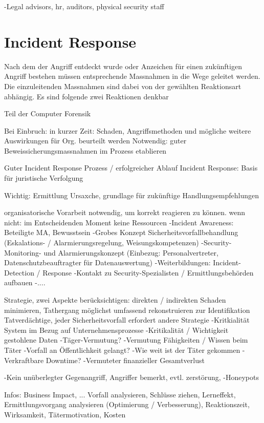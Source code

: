 -Legal advisors, hr, auditors, physical security staff

\section{Incident Response}
Nach dem der Angriff entdeckt wurde oder Anzeichen für einen zukünftigen Angriff bestehen müssen entsprechende Massnahmen in die Wege geleitet werden. Die einzuleitenden Massnahmen sind dabei von der gewählten Reaktionsart abhängig. Es sind folgende zwei Reaktionen denkbar

Teil der Computer Forensik

Bei Einbruch: in kurzer Zeit: Schaden, Angriffsmethoden und mögliche weitere Auswirkungen für Org. beurteilt werden
Notwendig: guter Beweissicherungsmassnahmen im Prozess etablieren

Guter Incident Response Prozess / erfolgreicher Ablauf Incident Response: Basis für juristische Verfolgung

Wichtig: Ermittlung Ursaxche, grundlage für zukünftige Handlungsempfehlungen

organisatorische Vorarbeit notwendig, um korrekt reagieren zu können. wenn nicht: im Entscheidenden Moment keine Ressourcen
-Incident Awareness: Beteiligte MA, Bewusstsein
-Grobes Konzept Sicherheitsvorfallbehandlung (Eskalations- / Alarmierungsregelung, Weisungskompetenzen)
-Security-Monitoring- und Alarmierungskonzept (Einbezug: Personalvertreter, Datenschutzbeauftragter für Datenauswertung)
-Weiterbildungen: Incident-Detection / Response
-Kontakt zu Security-Spezialisten / Ermittlungsbehörden aufbauen
-....

Strategie, zwei Aspekte berücksichtigen: direkten / indirekten Schaden minimieren, Tathergang möglichst umfassend rekonstruieren zur Identifikation Tatverdächtige, jeder Sicherheitsvorfall erfordert andere Strategie
-Kritkialität System im Bezug auf Unternehmensprozesse
-Kritikalität / Wichtigkeit gestohlene Daten
-Täger-Vermutung?
-Vermutung Fähigkeiten / Wissen beim Täter
-Vorfall an Öffentlichkeit gelangt?
-Wie weit ist der Täter gekommen
-Verkraftbare Downtime?
-Vermuteter finanzieller Gesamtverlust

-Kein unüberlegter Gegenangriff, Angriffer bemerkt, evtl. zerstörung,
-Honeypots

Infos: Business Impact, ...
Vorfall analysieren, Schlüsse ziehen, Lerneffekt, Ermittlungsvorgang analysieren (Optimierung / Verbesserung), Reaktionszeit, Wirksamkeit, Tätermotivation, Kosten

